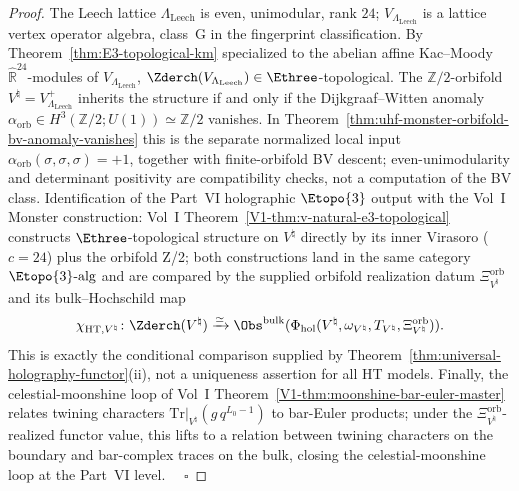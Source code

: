 \begin{proof}
The Leech lattice $\Lambda_{\mathrm{Leech}}$ is even, unimodular, rank
$24$; $V_{\Lambda_{\mathrm{Leech}}}$ is a lattice vertex operator
algebra, class~G in the fingerprint classification. By
Theorem~\ref{thm:E3-topological-km} specialized to the abelian affine
Kac--Moody $\widehat{\mathbb{R}}^{24}$-modules of
$V_{\Lambda_{\mathrm{Leech}}}$, $\Zderch(V_{\Lambda_{\mathrm{Leech}}})
\in \Ethree$-topological. The $\mathbb{Z}/2$-orbifold
$V^\natural = V_{\Lambda_{\mathrm{Leech}}}^+$ inherits the structure if
and only if the Dijkgraaf--Witten anomaly
$\alpha_{\mathrm{orb}} \in H^3(\mathbb{Z}/2; U(1)) \simeq \mathbb{Z}/2$
vanishes. In
Theorem~\ref{thm:uhf-monster-orbifold-bv-anomaly-vanishes} this is the
separate normalized local input
$\alpha_{\mathrm{orb}}(\sigma,\sigma,\sigma)=+1$, together with
finite-orbifold BV descent; even-unimodularity and determinant
positivity are compatibility checks, not a computation of the BV
class. Identification of the Part~VI holographic $\Etopo{3}$
output with the Vol~I Monster construction: Vol~I
Theorem~\ref{V1-thm:v-natural-e3-topological} constructs
$\Ethree$-topological structure on $V^\natural$ directly by its inner
Virasoro ($c=24$) plus the orbifold Z/2; both constructions land in the
same category $\Etopo{3}\text{-alg}$ and are compared by the supplied
orbifold realization datum
\(\Xi_{V^\natural}^{\mathrm{orb}}\) and its bulk--Hochschild map
\[
\chi_{\mathrm{HT},V^\natural}\colon
\Zderch(V^\natural)\xrightarrow{\simeq}
\Obs^{\mathrm{bulk}}(
\Phi_{\mathrm{hol}}(V^\natural,\omega_{V^\natural},
T_{V^\natural},\Xi_{V^\natural}^{\mathrm{orb}})).
\]
This is exactly the conditional comparison supplied by
Theorem~\ref{thm:universal-holography-functor}(ii), not a uniqueness
assertion for all HT models. Finally, the
celestial-moonshine loop of Vol~I
Theorem~\ref{V1-thm:moonshine-bar-euler-master} relates twining characters
$\mathrm{Tr}|_{V^\natural}(g\,q^{L_0-1})$ to bar-Euler products; under
the \(\Xi_{V^\natural}^{\mathrm{orb}}\)-realized functor value, this
lifts to a relation between twining characters on the boundary and
bar-complex traces on the bulk, closing the celestial-moonshine loop at
the Part~VI level. $\quad\square$
\end{proof}

